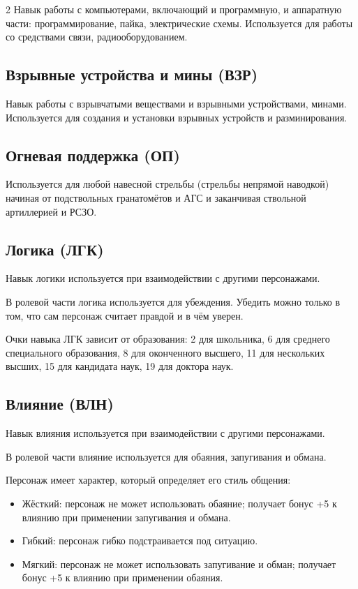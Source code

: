 \documentclass{article}
\begin{document}
\begin{multicols}{2}
Навык работы с компьютерами, включающий и программную, и аппаратную
части: программирование, пайка, электрические схемы. Используется для
работы со средствами связи, радиооборудованием.

\subsection{Взрывные устройства и мины (ВЗР)}\label{explosives}

Навык работы с взрывчатыми веществами и взрывными устройствами,
минами. Используется для создания и установки взрывных устройств и
разминирования.

\subsection{Огневая поддержка (ОП)}\label{fire-support}

Используется для любой навесной стрельбы (стрельбы непрямой наводкой)
начиная от подствольных гранатомётов и АГС и заканчивая ствольной
артиллерией и РСЗО.

\subsection{Логика (ЛГК)}\label{logic}

Навык логики используется при взаимодействии с другими персонажами.

В ролевой части логика используется для убеждения. Убедить можно только
в том, что сам персонаж считает правдой и в чём уверен.

Очки навыка ЛГК зависит от образования: 2 для школьника, 6 для среднего
специального образования, 8 для оконченного высшего, 11 для нескольких
высших, 15 для кандидата наук, 19 для доктора наук.

\subsection{Влияние (ВЛН)}\label{influence}

Навык влияния используется при взаимодействии с другими персонажами.

В ролевой части влияние используется для обаяния, запугивания и обмана.

Персонаж имеет характер, который определяет его стиль общения:

\begin{itemize}
\item
  Жёсткий: персонаж не может использовать обаяние; получает бонус +5 к
  влиянию при применении запугивания и обмана.
\item
  Гибкий: персонаж гибко подстраивается под ситуацию.
\item
  Мягкий: персонаж не может использовать запугивание и обман; получает
  бонус +5 к влиянию при применении обаяния.
\end{itemize}


\end{multicols}
\end{document}
